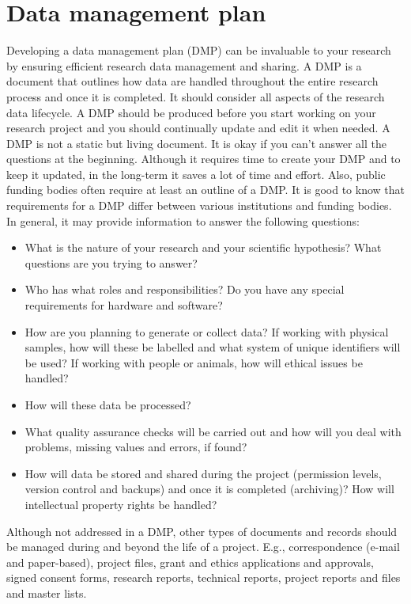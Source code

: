 \documentclass[
]{book}
\begin{document}
\hypertarget{data-management-plan}{%
\section{Data management plan}\label{data-management-plan}}

Developing a data management plan (DMP) can be invaluable to your research by ensuring efficient research data management and sharing. A DMP is a document that outlines how data are handled throughout the entire research process and once it is completed. It should consider all aspects of the research data lifecycle. A DMP should be produced before you start working on your research project and you should continually update and edit it when needed. A DMP is not a static but living document. It is okay if you can't answer all the questions at the beginning. Although it requires time to create your DMP and to keep it updated, in the long-term it saves a lot of time and effort. Also, public funding bodies often require at least an outline of a DMP. It is good to know that requirements for a DMP differ between various institutions and funding bodies. In general, it may provide information to answer the following questions:

\begin{itemize}
\item
  What is the nature of your research and your scientific hypothesis? What questions are you trying to answer?
\item
  Who has what roles and responsibilities? Do you have any special requirements for hardware and software?
\item
  How are you planning to generate or collect data? If working with physical samples, how will these be labelled and what system of unique identifiers will be used? If working with people or animals, how will ethical issues be handled?
\item
  How will these data be processed?
\item
  What quality assurance checks will be carried out and how will you deal with problems, missing values and errors, if found?
\item
  How will data be stored and shared during the project (permission levels, version control and backups) and once it is completed (archiving)? How will intellectual property rights be handled?
\end{itemize}

Although not addressed in a DMP, other types of documents and records should be managed during and beyond the life of a project. E.g., correspondence (e-mail and paper-based), project files, grant and ethics applications and approvals, signed consent forms, research reports, technical reports, project reports and files and master lists.
\end{document}
